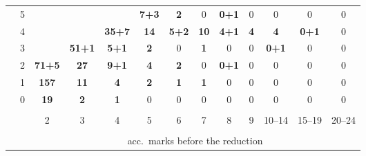 \begin{tabular}{cc|ccccccccccc|}
 & 
5
 & 
\footnotesize{}
 & 
\footnotesize{}
 & 
\footnotesize{}
 & 
\footnotesize{\cellcolor{blue!8}\textbf{7+3}}
 & 
\footnotesize{\cellcolor{blue!5}\textbf{2}}
 & 
\footnotesize{0}
 & 
\footnotesize{\cellcolor{blue!5}\textbf{0+1}}
 & 
\footnotesize{0}
 & 
\footnotesize{0}
 & 
\footnotesize{0}
 & 
\footnotesize{0}
\\
 & 
4
 & 
\footnotesize{}
 & 
\footnotesize{}
 & 
\footnotesize{\cellcolor{blue!19}\textbf{35+7}}
 & 
\footnotesize{\cellcolor{blue!9}\textbf{14}}
 & 
\footnotesize{\cellcolor{blue!7}\textbf{5+2}}
 & 
\footnotesize{\cellcolor{blue!8}\textbf{10}}
 & 
\footnotesize{\cellcolor{blue!6}\textbf{4+1}}
 & 
\footnotesize{\cellcolor{blue!6}\textbf{4}}
 & 
\footnotesize{\cellcolor{blue!6}\textbf{4}}
 & 
\footnotesize{\cellcolor{blue!5}\textbf{0+1}}
 & 
\footnotesize{0}
\\
 & 
3
 & 
\footnotesize{}
 & 
\footnotesize{\cellcolor{blue!22}\textbf{51+1}}
 & 
\footnotesize{\cellcolor{blue!7}\textbf{5+1}}
 & 
\footnotesize{\cellcolor{blue!5}\textbf{2}}
 & 
\footnotesize{0}
 & 
\footnotesize{\cellcolor{blue!5}\textbf{1}}
 & 
\footnotesize{0}
 & 
\footnotesize{0}
 & 
\footnotesize{\cellcolor{blue!5}\textbf{0+1}}
 & 
\footnotesize{0}
 & 
\footnotesize{0}
\\
 & 
2
 & 
\footnotesize{\cellcolor{blue!30}\textbf{71+5}}
 & 
\footnotesize{\cellcolor{blue!14}\textbf{27}}
 & 
\footnotesize{\cellcolor{blue!8}\textbf{9+1}}
 & 
\footnotesize{\cellcolor{blue!6}\textbf{4}}
 & 
\footnotesize{\cellcolor{blue!5}\textbf{2}}
 & 
\footnotesize{0}
 & 
\footnotesize{\cellcolor{blue!5}\textbf{0+1}}
 & 
\footnotesize{0}
 & 
\footnotesize{0}
 & 
\footnotesize{0}
 & 
\footnotesize{0}
\\
 & 
1
 & 
\footnotesize{\cellcolor{blue!57}\textcolor{black!10}{\textbf{157}}}
 & 
\footnotesize{\cellcolor{blue!8}\textbf{11}}
 & 
\footnotesize{\cellcolor{blue!6}\textbf{4}}
 & 
\footnotesize{\cellcolor{blue!5}\textbf{2}}
 & 
\footnotesize{\cellcolor{blue!5}\textbf{1}}
 & 
\footnotesize{\cellcolor{blue!5}\textbf{1}}
 & 
\footnotesize{0}
 & 
\footnotesize{0}
 & 
\footnotesize{0}
 & 
\footnotesize{0}
 & 
\footnotesize{0}
\\
 & 
0
 & 
\footnotesize{\cellcolor{blue!11}\textbf{19}}
 & 
\footnotesize{\cellcolor{blue!5}\textbf{2}}
 & 
\footnotesize{\cellcolor{blue!5}\textbf{1}}
 & 
\footnotesize{0}
 & 
\footnotesize{0}
 & 
\footnotesize{0}
 & 
\footnotesize{0}
 & 
\footnotesize{0}
 & 
\footnotesize{0}
 & 
\footnotesize{0}
 & 
\footnotesize{0}
\\
\cline{3-13}\vspace{-10pt}\\
\multicolumn{2}{c}{}
 & 
2
 & 
3
 & 
4
 & 
5
 & 
6
 & 
7
 & 
8
 & 
9
 & 
10--14
 & 
15--19
 & 
\multicolumn{1}{c}{20--24}

\\
\vspace{-10pt}\\
\multicolumn{2}{c}{} & \multicolumn{11}{c}{acc.~marks before the reduction} \\
\end{tabular}

